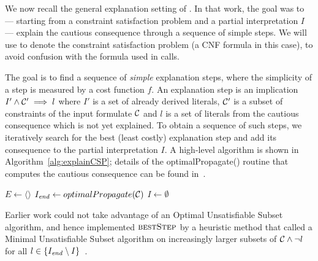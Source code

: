 
We now recall the general explanation setting of \citet{ecai/BogaertsGCG20}. 
In that work, the goal was to --- starting from a constraint satisfaction problem and a partial interpretation $I$ --- explain the cautious consequence through a sequence of simple steps. 
We will use \formulac to denote the constraint satisfaction problem (a CNF formula in this case), to avoid confusion with the formula \formula used in \omus calls.

The goal is to find a sequence of \textit{simple} explanation steps, where the simplicity of a step is measured by a cost function $f$. 
An explanation step is an implication $I' \wedge \mathcal{C} ' \implies l$ where $I'$ is a set of already derived literals, $\mathcal{C} '$ is a subset of constraints of the input formulate $\mathcal{C} $ and $l$ is a set of literals from the cautious consequence which is not yet explained.
To obtain a sequence of such steps, we iteratively search for the best (least costly) explanation step and add its consequence to the partial interpretation $I$. A high-level algorithm is shown in Algorithm~\ref{alg:explainCSP}; details of the optimalPropagate() routine that computes the cautious consequence can be found in~\cite{ecai/BogaertsGCG20}.

\begin{algorithm}[ht]
  \caption{$\call{ExplainCSP}(\formulac,f)$}
  \label{alg:explainCSP}
$E \gets \langle \rangle$\;
$I_{\mathit{end}} \gets optimalPropagate(\mathcal{C} )$\;
$I \gets \emptyset$\;
\;
\end{algorithm}

Earlier work could not take advantage of an Optimal Unsatisfiable Subset algorithm, and hence implemented $\textsc{bestStep}$ by a heuristic method that called a Minimal Unsatisfiable Subset algorithm on increasingly larger subsets of $\mathcal{C}  \wedge \lnot l$ for all $l \in \{I_{\mathit{end}} \setminus I\}$~\cite{ecai/BogaertsGCG20}.


